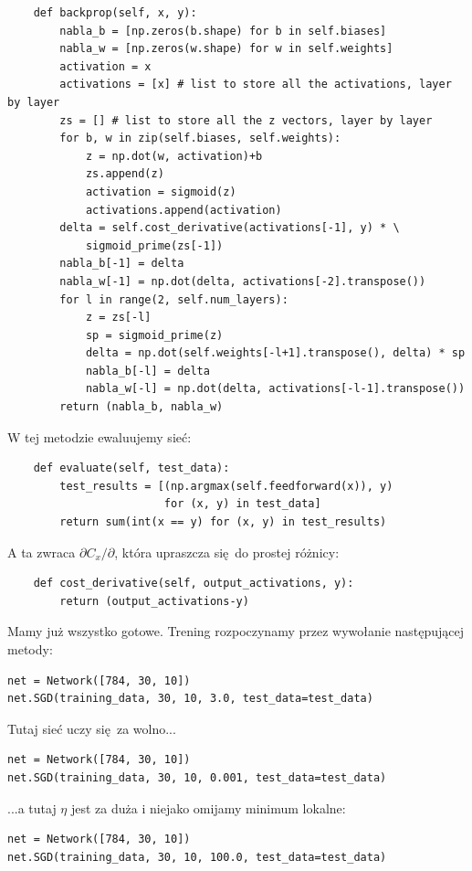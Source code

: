 \documentclass[10pt, oneside]{article}
\theoremstyle{remark}
\begin{document}
\begin{verbatim}
    def backprop(self, x, y):
        nabla_b = [np.zeros(b.shape) for b in self.biases]
        nabla_w = [np.zeros(w.shape) for w in self.weights]
        activation = x
        activations = [x] # list to store all the activations, layer by layer
        zs = [] # list to store all the z vectors, layer by layer
        for b, w in zip(self.biases, self.weights):
            z = np.dot(w, activation)+b
            zs.append(z)
            activation = sigmoid(z)
            activations.append(activation)
        delta = self.cost_derivative(activations[-1], y) * \
            sigmoid_prime(zs[-1])
        nabla_b[-1] = delta
        nabla_w[-1] = np.dot(delta, activations[-2].transpose())
        for l in range(2, self.num_layers):
            z = zs[-l]
            sp = sigmoid_prime(z)
            delta = np.dot(self.weights[-l+1].transpose(), delta) * sp
            nabla_b[-l] = delta
            nabla_w[-l] = np.dot(delta, activations[-l-1].transpose())
        return (nabla_b, nabla_w)
\end{verbatim}
W tej metodzie ewaluujemy sieć:
\begin{verbatim}
    def evaluate(self, test_data):
        test_results = [(np.argmax(self.feedforward(x)), y)
                        for (x, y) in test_data]
        return sum(int(x == y) for (x, y) in test_results)
\end{verbatim}
A ta zwraca $\partial C_x / \partial$, która upraszcza się do prostej różnicy:
\begin{verbatim}
    def cost_derivative(self, output_activations, y):
        return (output_activations-y)
\end{verbatim}

Mamy już wszystko gotowe. 
Trening rozpoczynamy przez wywołanie następującej metody:
\begin{verbatim}
net = Network([784, 30, 10])
net.SGD(training_data, 30, 10, 3.0, test_data=test_data)	
\end{verbatim}
Tutaj sieć uczy się za wolno...
\begin{verbatim}
net = Network([784, 30, 10])
net.SGD(training_data, 30, 10, 0.001, test_data=test_data)	
\end{verbatim}
...a tutaj $\eta$ jest za duża i niejako omijamy minimum lokalne:
\begin{verbatim}
net = Network([784, 30, 10])
net.SGD(training_data, 30, 10, 100.0, test_data=test_data)	
\end{verbatim}
\end{document}
